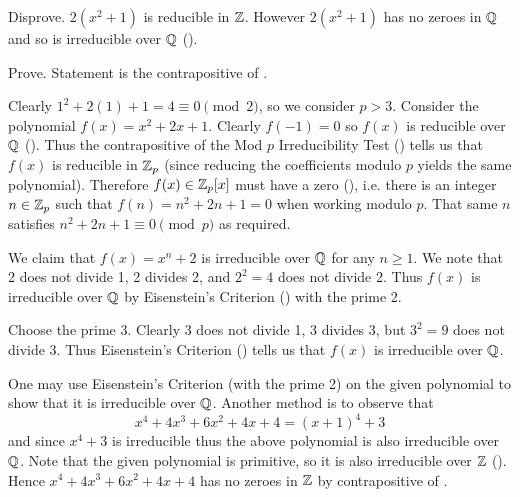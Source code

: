\begin{questions}
    \item \begin{partquestions}{\alph*}
        \item Disprove. $2(x^2+1)$ is reducible in $\mathbb{Z}$. However $2(x^2+1)$ has no zeroes in $\mathbb{Q}$ and so is irreducible over $\mathbb{Q}$ ().
        
        \item Prove. Statement is the contrapositive of .
    \end{partquestions}

    \item Clearly $1^2 + 2(1) + 1 = 4 \equiv 0 \pmod2$, so we consider $p > 3$. Consider the polynomial $f(x) = x^2 + 2x + 1$. Clearly $f(-1) = 0$ so $f(x)$ is reducible over $\mathbb{Q}$ (). Thus the contrapositive of the Mod $p$ Irreducibility Test () tells us that $f(x)$ is reducible in $\mathbb{Z}_p$ (since reducing the coefficients modulo $p$ yields the same polynomial). Therefore $f(x) \in \mathbb{Z}_p[x]$ must have a zero (), i.e. there is an integer $n \in \mathbb{Z}_p$ such that $f(n) = n^2 + 2n + 1 = 0$ when working modulo $p$. That same $n$ satisfies $n^2 + 2n + 1 \equiv 0 \pmod{p}$ as required.

    \item We claim that $f(x) = x^n + 2$ is irreducible over $\mathbb{Q}$ for any $n \geq 1$. We note that 2 does not divide 1, 2 divides 2, and $2^2 = 4$ does not divide 2. Thus $f(x)$ is irreducible over $\mathbb{Q}$ by Eisenstein's Criterion () with the prime 2.

    \item \begin{partquestions}{\roman*}
        \item Choose the prime 3. Clearly 3 does not divide 1, 3 divides 3, but $3^2 = 9$ does not divide 3. Thus Eisenstein's Criterion () tells us that $f(x)$ is irreducible over $\mathbb{Q}$.

        \item One may use Eisenstein's Criterion (with the prime 2) on the given polynomial to show that it is irreducible over $\mathbb{Q}$. Another method is to observe that
        \[
            x^4 + 4x^3 + 6x^2 + 4x + 4 = (x+1)^4 + 3
        \]
        and since $x^4 + 3$ is irreducible thus the above polynomial is also irreducible over $\mathbb{Q}$. Note that the given polynomial is primitive, so it is also irreducible over $\mathbb{Z}$ (). Hence $x^4 + 4x^3 + 6x^2 + 4x + 4$ has no zeroes in $\mathbb{Z}$ by contrapositive of .


\end{partquestions}
\end{questions}
